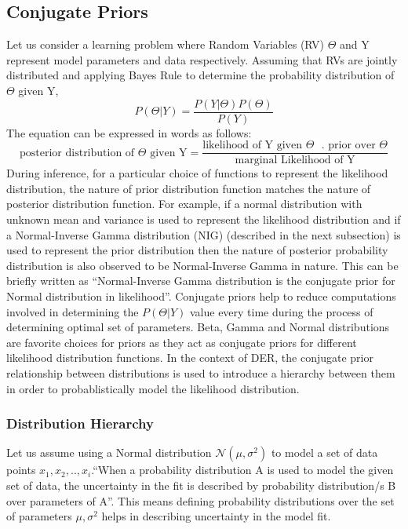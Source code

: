 	\subsection{Conjugate Priors}
	Let us consider a learning problem where Random Variables (RV) $\Theta$ and Y represent model parameters and data respectively. Assuming that RVs are jointly distributed and applying Bayes Rule to determine the probability distribution of $\Theta$ given Y,
	\begin{equation*}
		P(\Theta|Y) = \frac{P(Y|\Theta)P(\Theta)}{P(Y)}
	\end{equation*}
	The equation can be expressed in words as follows:
	\begin{equation*}
		\text{posterior distribution of $\Theta$ given Y}=\frac{\text{likelihood of Y given $\Theta$ }.\text{ prior over $\Theta$}}{\text{marginal Likelihood of Y}}
	\end{equation*}
	During inference, for a particular choice of functions to represent the likelihood distribution, the nature of prior distribution function matches the nature of posterior distribution function. For example, if a normal distribution with unknown mean and
	variance is used to represent the likelihood distribution and if a Normal-Inverse Gamma distribution (NIG) (described in the next subsection) is used to represent the prior distribution then the nature of posterior probability distribution is also observed to be Normal-Inverse Gamma in nature. This can be briefly written as \enquote{Normal-Inverse Gamma distribution is the conjugate prior for Normal distribution in likelihood}.
	Conjugate priors help to reduce computations involved in determining the $P(\Theta|Y )$ value every time during the process of determining optimal set of parameters. Beta, Gamma and Normal distributions are favorite choices for priors as they act as conjugate priors for different likelihood distribution functions. In the context of DER, the conjugate prior relationship between distributions is used to introduce a hierarchy between them in order to probablistically model the likelihood distribution. 
	\subsubsection{Distribution Hierarchy}
	Let us assume using a Normal distribution $\mathcal{N}(\mu,\sigma^2)$ to model a set of data points $x_1,x_2,..,x_i$.\enquote{When a probability distribution A is used to model the given set of data, the uncertainty in the fit is described by probability distribution/s B over parameters of A}. This means defining probability distributions over the set of parameters $\mu,\sigma^2$ helps in describing uncertainty in the model fit.
	 
